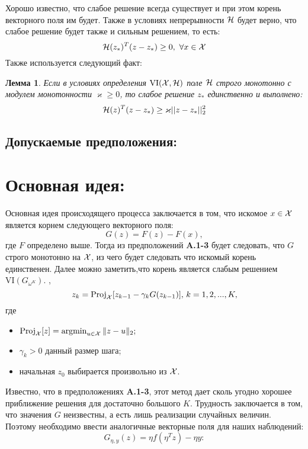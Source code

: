 \documentclass[11pt]{article}
\def\cX{{\cal X}}
\def\cH{{\cal H}}
\def\cX{{\cal X}}
\def\VI{{\textrm{VI}}}
\def\Proj{{\mathrm{Proj}}}
\def\argmin{\mathop\mathrm{argmin}}
\newtheorem{lemma}{Лемма}[section]
\begin{document}
Хорошо известно, что слабое решение всегда существует и при этом корень векторного поля им будет. Также в условиях непрерывности $\cH$ будет верно, что слабое решение будет также и сильным решением, то есть:
\begin{equation}
    \label{v_i_strong}
    \cH(z_*)^T(z - z_*) \ge 0, ~ \forall{x \in \cX{}} 
\end{equation}
Также используется следующий факт:
\begin{lemma}
\label{very_good_lemma}
    Если в условиях определения $\VI(\cX{}, \cH)$ поле $\cH$ строго монотонно с модулем монотонности $\varkappa \ge 0$, то слабое решение $z_*$ единственно и выполнено:
    \begin{equation}
        \label{v_i_lemma}
        \cH(z)^T(z - z_*) \ge \varkappa||z - z_*||_2^2
    \end{equation}
\end{lemma}

\subsection{Допускаемые предположения:}

\section{Основная идея:}
Основная идея происходящего процесса заключается в том, что искомое $x \in \cX$ является корнем следующего векторного поля:
\begin{equation}
    \label{gz_def}
    G(z) = F(z) - F(x),
\end{equation}
где $F$ определено выше. Тогда из предположений \textbf{A.1-3} будет следовать, что $G$ строго монотонно на $\cX$, из чего будет следовать что искомый корень единственен. Далее можно заметить,что корень является слабым решением  $\VI(G_{\omega^K})$. 
, $$
    z_{k}=\Proj_{\cX}[z_{k-1}-\gamma_k G(z_{k-1})],\,k=1,2,...,K,
$$
где
\begin{itemize}
    \item $\Proj_{\cX}[z]=\argmin_{u\in\cX} \|z-u\|_2;$
    \item $\gamma_k>0$ данный размер шага;
    \item начальная $z_0$ выбирается произвольно из $\cX$.
\end{itemize}
Известно, что в предположениях \textbf{A.1-3}, этот метод дает сколь угодно хорошее приближение решения
для достаточно большого $K$. Трудность заключается в том, что значения $G$ неизвестны, а есть лишь реализации случайных величин. Поэтому необходимо ввести аналогичные векторные поля для наших наблюдений:
\begin{equation}
    \label{g_en_def}
    G_{\eta,y}(z) =\eta f(\eta^Tz)- \eta y:
\end{equation}
\end{document}
